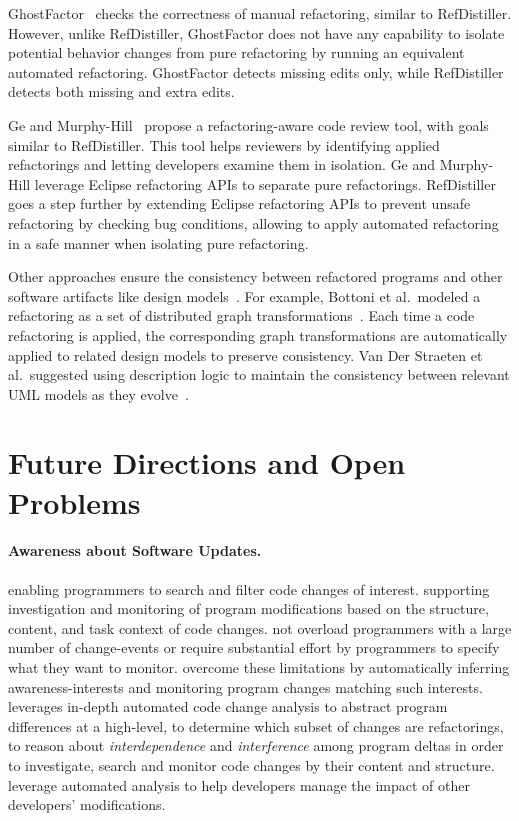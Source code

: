 \documentclass[runningheads,a4paper]{llncs}
\begin{document}
GhostFactor~\cite{geManual2014} checks the correctness of manual refactoring, similar to RefDistiller. 
However, unlike RefDistiller, GhostFactor does not have any capability to isolate potential behavior changes from pure refactoring by running an equivalent automated refactoring. GhostFactor detects missing edits only, while RefDistiller detects both missing and extra edits. 

Ge and Murphy-Hill~\cite{emersoncodereview:2014chase} propose a refactoring-aware code review tool, with goals similar to RefDistiller. This tool helps reviewers by identifying applied refactorings and letting developers examine them in isolation. Ge and Murphy-Hill leverage Eclipse refactoring APIs to separate pure refactorings. RefDistiller goes a step further by extending Eclipse refactoring APIs to prevent unsafe refactoring by checking bug conditions, allowing to apply automated refactoring in a safe manner when isolating pure refactoring. 


Other approaches ensure the consistency between refactored programs and other software artifacts like design models~\cite{Bottoni2003:coordinatedTransformation,Straeten2003:UML}. For example, Bottoni et al.~modeled a refactoring as a set of distributed graph transformations~\cite{Bottoni2003:coordinatedTransformation}. Each time a code refactoring is applied, the corresponding graph transformations are automatically applied to related design models to preserve consistency. Van Der Straeten et al.~suggested using description logic to maintain the consistency between relevant UML models as they evolve~\cite{Straeten2003:UML}.


\section{Future Directions and Open Problems} 

\paragraph{Awareness about Software Updates.} 
enabling programmers to search and filter code changes of interest. 
supporting investigation and monitoring of program modifications based on the structure, content, and task context of code changes.
not overload programmers with a large number of change-events or require substantial effort by programmers to specify what they want to monitor. 
overcome these limitations by automatically inferring awareness-interests and monitoring program changes matching such interests. 
leverages in-depth automated code change analysis to abstract program differences at a high-level, to determine which subset of changes are refactorings, to reason about {\em interdependence} and {\em interference} among program deltas in order to investigate, search and monitor code changes by their content and structure.  
leverage automated analysis to help developers manage the impact of other developers' modifications. 
\end{document}
